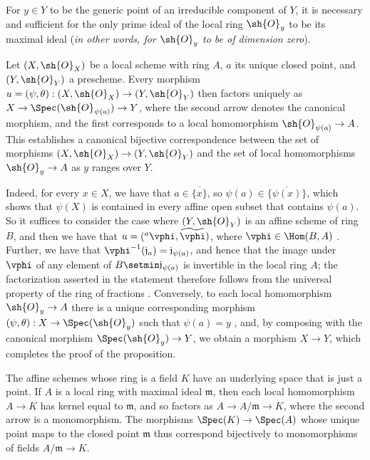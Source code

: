 \begin{corollary}[2.4.3]
\label{I.2.4.3}
For $y\in Y$ to be the generic point of an irreducible component of $Y$, it is necessary and sufficient for the only prime ideal of the local ring $\sh{O}_y$ to be its maximal ideal (\emph{in other words, for $\sh{O}_y$ to be of \emph{dimension zero}}).
\end{corollary}

\begin{proposition}[2.4.4]
\label{I.2.4.4}
Let $(X,\sh{O}_X)$ be a local scheme with ring $A$, $a$ its unique closed point, and $(Y,\sh{O}_Y)$ a prescheme.
Every morphism $u=(\psi,\theta):(X,\sh{O}_X)\to(Y,\sh{O}_Y)$ then factors uniquely as $X\to\Spec(\sh{O}_{\psi(a)})\to Y$, where the second arrow denotes the canonical morphism, and the first corresponds to a local homomorphism $\sh{O}_{\psi(a)}\to A$.
This establishes a canonical bijective correspondence between the set of morphisms $(X,\sh{O}_X)\to(Y,\sh{O}_Y)$ and the set of local homomorphisms $\sh{O}_y\to A$ as $y$ ranges over $Y$.
\end{proposition}

Indeed, for every $x\in X$, we have that $a\in\overline{\{x\}}$, so $\psi(a)\in\overline{\{\psi(x)\}}$, which shows that $\psi(X)$ is contained in every affine open subset that contains $\psi(a)$.
So it suffices to consider the case where $(Y,\sh{O}_Y)$ is an affine scheme of ring $B$, and then we have that $u=({}^a\vphi,\widetilde{\vphi})$, where $\vphi\in\Hom(B,A)$ .
Further, we have that $\vphi^{-1}(\mathfrak{j}_a)=\mathfrak{j}_{\psi(a)}$, and hence that the image under $\vphi$ of any element of $B\setmin\mathfrak{j}_{\psi(a)}$ is invertible in the local ring $A$;
the factorization asserted in the statement therefore follows from the universal property of the ring of fractions .
Conversely, to each local homomorphism $\sh{O}_y\to A$ there is a unique corresponding morphism $(\psi,\theta):X\to\Spec(\sh{O}_y)$ such that $\psi(a)=y$ , and, by composing with the canonical morphism $\Spec(\sh{O}_y)\to Y$, we obtain a morphism $X\to Y$, which completes the proof of the proposition.

\begin{env}[2.4.5]
\label{I.2.4.5}
The affine schemes whose ring is a field $K$ have an underlying space that is just a point.
If $A$ is a local ring with maximal ideal $\mathfrak{m}$, then each local homomorphism $A\to K$ has kernel equal to $\mathfrak{m}$, and so factors as $A\to A/\mathfrak{m}\to K$, where the second arrow is a monomorphism.
The morphisms $\Spec(K)\to\Spec(A)$ whose unique point maps to the closed point $\mathfrak{m}$ thus correspond bijectively to monomorphisms of fields $A/\mathfrak{m}\to K$.
\end{env}

